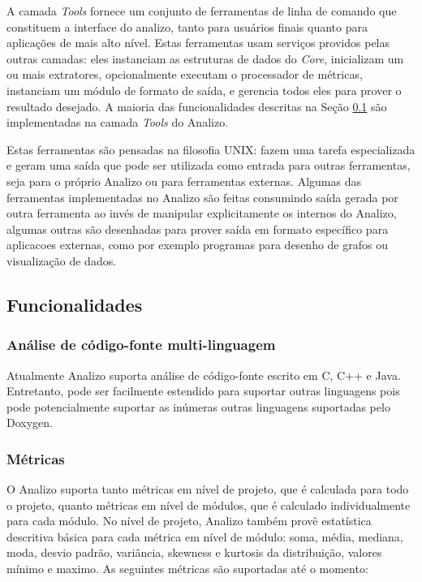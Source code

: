 A camada {\it Tools} fornece um conjunto de ferramentas de linha de comando que
constituem a interface do analizo, tanto para usuários finais quanto para
aplicações de mais alto nível. Estas ferramentas usam serviços providos pelas
outras camadas: eles instanciam as estruturas de dados do {\it Core},
inicializam um ou mais extratores, opcionalmente executam o processador de
métricas, instanciam um módulo de formato de saída, e gerencia todos eles para
prover o resultado desejado. A maioria das funcionalidades descritas na Seção
\ref{funcionalidades} são implementadas na camada {\it Tools} do Analizo.

Estas ferramentas são pensadas na filosofia UNIX: fazem uma tarefa
especializada e geram uma saída que pode ser utilizada como entrada para outras
ferramentas, seja para o próprio Analizo ou para ferramentas externas. Algumas das
ferramentas implementadas no Analizo são feitas consumindo saída gerada por
outra ferramenta ao invés de manipular explicitamente os internos do Analizo,
algumas outras são desenhadas para prover saída em formato específico para
aplicacoes externas, como por exemplo programas para desenho de grafos ou
visualização de dados.

\subsection{Funcionalidades}\label{funcionalidades}

\subsubsection{Análise de código-fonte multi-linguagem}

Atualmente Analizo suporta análise de código-fonte escrito em C, C++ e Java.
Entretanto, pode ser facilmente estendido para suportar outras linguagens pois
pode potencialmente suportar as inúmeras outras linguagens suportadas pelo Doxygen.

\subsubsection{Métricas}\label{metricas}

O Analizo suporta tanto métricas em nível de projeto, que é calculada para todo o projeto,
quanto métricas em nível de módulos, que é calculado individualmente para cada módulo.
No nível de projeto, Analizo também provê estatística descritiva básica para cada métrica em
nível de módulo: soma, média, mediana, moda, desvio padrão, variância, skewness e kurtosis da
distribuição, valores mínimo e maximo. As seguintes métricas são suportadas até o momento:

